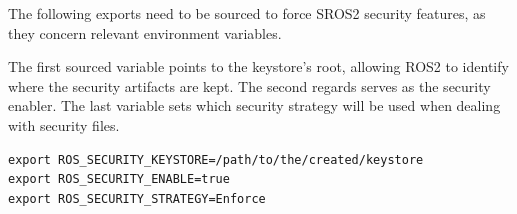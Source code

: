             
The following exports need to be sourced to force SROS2 security features, as they concern relevant environment variables.

The first sourced variable points to the keystore's root, allowing ROS2 to identify where the security artifacts are kept. The second regards serves as the security enabler. The last variable sets which security strategy will be used when dealing with security files.
            
\begin{lstlisting}[title={SROS2 environment variables.}]
export ROS_SECURITY_KEYSTORE=/path/to/the/created/keystore
export ROS_SECURITY_ENABLE=true
export ROS_SECURITY_STRATEGY=Enforce
\end{lstlisting}


            
                


